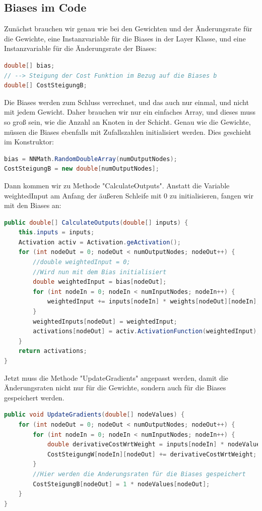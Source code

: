 \documentclass[12pt]{article}
\begin{document}
\subsection{Biases im Code}
Zunächst brauchen wir genau wie bei den Gewichten und der Änderungsrate für die Gewichte, eine Instanzvariable für die Biases in der Layer Klasse, und eine Instanzvariable für die Änderungsrate der Biases:\begin{lstlisting}[language=Java]
double[] bias;
// --> Steigung der Cost Funktion im Bezug auf die Biases b
double[] CostSteigungB;
\end{lstlisting}
Die Biases werden zum Schluss verrechnet, und das auch nur einmal, und nicht mit jedem Gewicht. Daher brauchen wir nur ein einfaches Array, und dieses muss so groß sein, wie die Anzahl an Knoten in der Schicht. Genau wie die Gewichte, müssen die Biases ebenfalls mit Zufallszahlen initialisiert werden. Dies geschieht im Konstruktor:\begin{lstlisting}[language=Java]
bias = NNMath.RandomDoubleArray(numOutputNodes);
CostSteigungB = new double[numOutputNodes];
\end{lstlisting}
Dann kommen wir zu Methode "CalculateOutputs". Anstatt die Variable weightedInput am Anfang der äußeren Schleife mit 0 zu initialisieren, fangen wir mit den Biases an:\begin{lstlisting}[language=Java]
public double[] CalculateOutputs(double[] inputs) {
    this.inputs = inputs;
    Activation activ = Activation.geActivation();
    for (int nodeOut = 0; nodeOut < numOutputNodes; nodeOut++) {
        //double weightedInput = 0;
        //Wird nun mit dem Bias initialisiert
        double weightedInput = bias[nodeOut];
        for (int nodeIn = 0; nodeIn < numInputNodes; nodeIn++) {
            weightedInput += inputs[nodeIn] * weights[nodeOut][nodeIn];
        }
        weightedInputs[nodeOut] = weightedInput;
        activations[nodeOut] = activ.ActivationFunction(weightedInput);
    }
    return activations;
}
\end{lstlisting}
Jetzt muss die Methode "UpdateGradients" angepasst werden, damit die Änderungsraten nicht nur für die Gewichte, sondern auch für die Biases gespeichert werden.
\begin{lstlisting}[language=Java]
public void UpdateGradients(double[] nodeValues) {
    for (int nodeOut = 0; nodeOut < numOutputNodes; nodeOut++) {
        for (int nodeIn = 0; nodeIn < numInputNodes; nodeIn++) {
            double derivativeCostWrtWeight = inputs[nodeIn] * nodeValues[nodeOut];
            CostSteigungW[nodeIn][nodeOut] += derivativeCostWrtWeight;
        }
        //Hier werden die Anderungsraten für die Biases gespeichert
        CostSteigungB[nodeOut] = 1 * nodeValues[nodeOut];
    }
}
\end{lstlisting}
\end{document}
